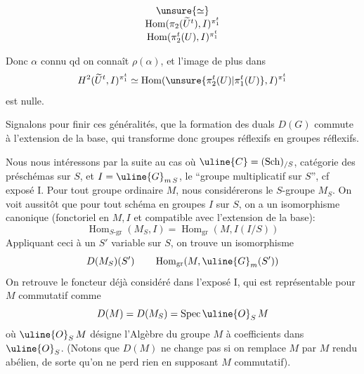 \[
\begin{array}{c}
\unsure{\simeq}\\
\operatorname{Hom}(\pi_2(\widetilde U^t),I)^{\pi_1^t}\\
\operatorname{Hom}(\pi_2^t(U),I)^{\pi_1^t}
\end{array}
\]

Donc $\alpha$ connu qd on connaît
$\rho(\alpha)$, et l'image de plus dans
\[
H^2(\widetilde U^t,I)^{\pi_1^t}
\simeq\operatorname{Hom}(\unsure{\pi_2^t(U)|\pi_1^t(U)},I)^{\pi_1^t}
\]
est nulle.

Signalons pour finir ces généralités, que la formation des duals
$D(G)$ commute à l'extension de la base, qui transforme donc groupes
réflexifs en groupes réflexifs.

Nous nous intéressons par la suite au cas où
$\uline{C}=(\mathrm{Sch})_{/S}$, catégorie
des préschémas sur $S$, et $I=\uline{G}_{m\,S}$,
le ``groupe multiplicatif sur $S$'',
cf exposé I. Pour tout groupe  ordinaire $M$, nous considérerons
le $S$-groupe $M_S$. On voit aussitôt que pour tout schéma en groupes
$I$ sur $S$, on a un isomorphisme canonique
(fonctoriel en $M,I$ et compatible avec l'extension de la base):
\[
\operatorname{Hom}_{S\text{-gr}}(M_S,I)
=\operatorname{Hom}_{\mathrm{gr}}(M,I(I/S))
\]
Appliquant ceci à un $S'$ variable sur $S$, on trouve un isomorphisme
\[
D(M_S)(S')\qquad\operatorname{Hom}_{\mathrm{gr}}(M,\uline{G}_m(S'))
\]
On retrouve le foncteur déjà considéré dans l'exposé I,
qui est représentable 
pour $M$ commutatif comme
\[
D(M)=D(M_S)=\operatorname{Spec}\uline{O}_S\,M
\]
où $\uline{O}_S\,M$ désigne l'Algèbre du groupe $M$ à coefficients dans
$\uline{O}_S$. (Notons
que $D(M)$ ne change pas si on remplace $M$ par $M$ rendu
abélien, de sorte 
qu'on ne perd rien en supposant $M$ commutatif).

